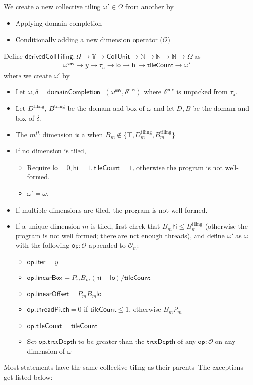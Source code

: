 We create a new collective tiling $\omega' \in \Omega$ from another by
\begin{itemize}
  \item Applying domain completion
  \filbreak
  \item Conditionally adding a new dimension operator ($\mathcal{O}$)
\end{itemize}
\filbreak
Define $\mathsf{derivedCollTiling}: \Omega \to \mathbb{Y} \to \mathsf{CollUnit} \to \mathbb{N} \to \mathbb{N} \to \mathbb{N} \to \Omega$ as
\begin{gather*}
  \mathsf{\omega^{env}} \to y \to \tau_u \to \mathsf{lo} \to \mathsf{hi} \to \mathsf{tileCount} \to \omega'
\end{gather*}
where we create $\omega'$ by
\filbreak
\begin{itemize}
  \item Let $\omega, \delta = \mathsf{domainCompletion_\top}(\mathsf{\omega^{env}}, \delta^\text{env})$ where $\delta^\text{env}$ is unpacked from $\tau_u$.
  \filbreak
  \item Let $D^\text{tiling}$, $B^\text{tiling}$ be the domain and box of $\omega$ and let $D, B$ be the domain and box of $\delta$.
  \filbreak
  \item The $m^{th}$ dimension is a  when $B_m \notin \{ \top, D_m^\text{tiling}, B_m^\text{tiling} \}$
  \filbreak
  \item If no dimension is tiled,
  \begin{itemize}
    \item Require $\mathsf{lo}=0, \mathsf{hi}=1, \mathsf{tileCount} = 1$, otherwise the program is not well-formed.
    \item $\omega' = \omega$.
  \end{itemize}
  \filbreak
  \item If multiple dimensions are tiled, the program is not well-formed.
  \filbreak
  \item If a unique dimension $m$ is tiled, first check that $B_m \mathsf{hi} \le B_m^\text{tiling}$ (otherwise the program is not well formed; there are not enough threads), and define $\omega'$ as $\omega$ with the following $\mathsf{op}: \mathcal{O}$ appended to $\mathcal{O}_m$:
  \begin{itemize}
    \item $\mathsf{op.iter} = y$
    \filbreak
    \item $\mathsf{op.linearBox} = P_m B_m (\mathsf{hi} - \mathsf{lo}) / \mathsf{tileCount}$
    \filbreak
    \item $\mathsf{op.linearOffset} = P_m B_m \mathsf{lo}$
    \filbreak
    \item $\mathsf{op.threadPitch} = 0$ if $\mathsf{tileCount} \le 1$, otherwise $B_m P_m$
    \filbreak
    \item $\mathsf{op.tileCount} = \mathsf{tileCount}$
    \filbreak
    \item Set $\mathsf{op.treeDepth}$ to be greater than the $\mathsf{treeDepth}$ of any $\mathsf{op} : \mathcal{O}$ on any dimension of $\omega$
  \end{itemize}
\end{itemize}
\filbreak
Most statements have the same collective tiling as their parents.
The exceptions get listed below:

